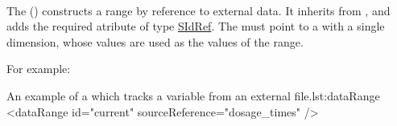 \begin{blockChanged}
\paragraph{}
\label{class:dataRange}
The  () constructs a range by reference to external data. It inherits from \Range, and adds the required atribute  of type \hyperref[type:sidref]{SIdRef}.  The  must point to a \DataDescription with a single dimension, whose values are used as the values of the range.

For example:

\begin{myXmlLst}{An example of a  which tracks a variable from an external file.}{lst:dataRange}
    <dataRange id="current" sourceReference="dosage_times" />
\end{myXmlLst}
\end{blockChanged}



